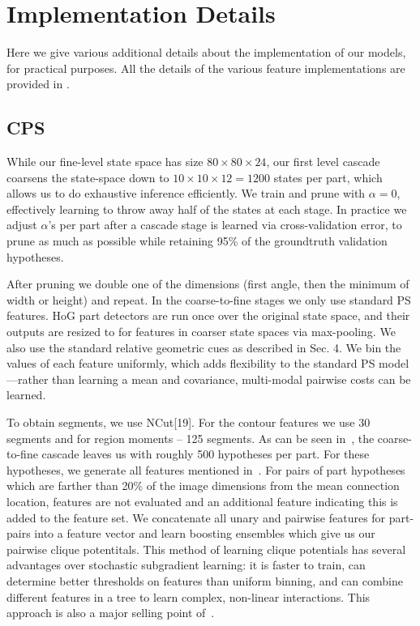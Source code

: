 \section{Implementation Details}\label{sec:impl-details}

Here we give various additional details about the implementation of our models, 
for practical purposes.  All the details of the various feature implementations 
are provided in .

\subsection{CPS}
 While our fine-level state space has size $80 
\times 80 \times 24$, our first level cascade coarsens the state-space down to 
$10 \times 10 \times 12 = 1200$ states per part, which allows us to do 
exhaustive inference efficiently.  We train and prune with $\alpha = 0$, 
effectively learning to throw away half of the states at each stage.  In 
practice we adjust $\alpha$'s per part after a cascade stage is learned via 
cross-validation error, to prune as much as possible while retaining 95\% of 
the groundtruth validation hypotheses.

After pruning we double one of the dimensions (first angle, then the minimum of 
width or height) and repeat. In the coarse-to-fine stages we only use standard 
PS features.  HoG part detectors are run once over the original state space, 
and their outputs are resized to for features in coarser state spaces via 
max-pooling.  We also use the standard relative geometric cues as described in 
Sec.  4. We bin the values of each feature uniformly, which adds flexibility to 
the standard PS model—rather than learning a mean and covariance, multi-modal 
pairwise costs can be learned.

 To obtain segments, we use NCut[19]. For the contour 
features we use 30 segments and for region moments – 125 segments.  As can be 
seen in~, the coarse-to-fine cascade leaves us with roughly 500 
hypotheses per part.  For these hypotheses, we generate all features mentioned 
in~.  For pairs of part hypotheses which are farther than 20\% 
of the image dimensions from the mean connection location, features are not 
evaluated and an additional feature indicating this is added to the feature 
set.  We concatenate all unary and pairwise features for part-pairs into a 
feature vector and learn boosting ensembles which give us our pairwise clique 
potentitals.  This method of learning clique potentials has several advantages 
over stochastic subgradient learning: it is faster to train, can determine 
better thresholds on features than uniform binning, and can combine different 
features in a tree to learn complex, non-linear interactions.  This approach is 
also a major selling point of~\citet{dtf2011}.

